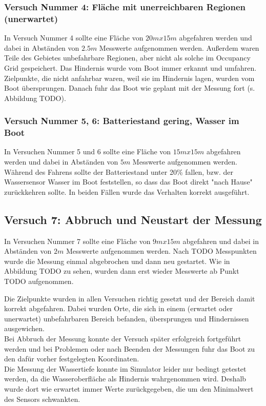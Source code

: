 \documentclass[11pt]{article}
\begin{document}
\subsubsection{Versuch Nummer 4: Fläche mit unerreichbaren Regionen (unerwartet)}
In Versuch Nummer 4 sollte eine Fläche von $20mx15m$ abgefahren werden und dabei in Abständen von $2.5m$ Messwerte aufgenommen werden. Außerdem waren Teile des Gebietes unbefahrbare Regionen, aber nicht als solche im Occupancy Grid gespeichert. Das Hindernis wurde vom Boot immer erkannt und umfahren. Zielpunkte, die nicht anfahrbar waren, weil sie im Hindernis lagen, wurden vom Boot übersprungen. Danach fuhr das Boot wie geplant mit der Messung fort (s. Abbildung TODO).

\subsubsection{Versuch Nummer 5, 6: Batteriestand gering, Wasser im Boot}
In Versuchen Nummer 5 und 6 sollte eine Fläche von $15mx15m$ abgefahren werden und dabei in Abständen von $5m$ Messwerte aufgenommen werden. Während des Fahrens sollte der Batteriestand unter 20\% fallen, bzw. der Wassersensor Wasser im Boot feststellen, so dass das Boot direkt "nach Hause" zurückkehren sollte. In beiden Fällen wurde das Verhalten korrekt ausgeführt.\\

\subsection{Versuch 7: Abbruch und Neustart der Messung}
In Versuchen Nummer 7 sollte eine Fläche von $9mx15m$ abgefahren und dabei in Abständen von $2m$ Messwerte aufgenommen werden. Nach TODO Messpunkten wurde die Messung einmal abgebrochen und dann neu gestartet. Wie in Abbildung TODO zu sehen, wurden dann erst wieder Messwerte ab Punkt TODO aufgenommen.

Die Zielpunkte wurden in allen Versuchen richtig gesetzt und der Bereich damit korrekt abgefahren. Dabei wurden Orte, die sich in einem (erwartet oder unerwartet) unbefahrbaren Bereich befanden, übersprungen und Hindernissen ausgewichen.\\
Bei Abbruch der Messung konnte der Versuch später erfolgreich fortgeführt werden und bei Problemen oder nach Beenden der Messungen fuhr das Boot zu den dafür vorher festgelegten Koordinaten.\\
Die Messung der Wassertiefe konnte im Simulator leider nur bedingt getestet werden, da die Wasseroberfläche als Hindernis wahrgenommen wird. Deshalb wurde dort wie erwartet immer Werte zurückgegeben, die um den Minimalwert des Sensors schwankten.
\end{document}
